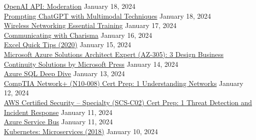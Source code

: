 \documentclass[10pt]{res} %
\begin{document}
\begin{resume}
\href{https://www.linkedin.com/learning/certificates/b073c9d3bcc1a341ef4e618526abf37df04bd7fcd250d2da87a54361739bb1f3}{\color{blue}OpenAI API: Moderation} \hfill January 18, 2024 \\
\href{https://www.linkedin.com/learning/certificates/3502c09cad07475d2d62a9f76be04f8eabe9f5ba771e18f6215a88fb8bdb9b4c}{\color{blue}Prompting ChatGPT with Multimodal Techniques} \hfill January 18, 2024 \\
\href{https://www.linkedin.com/learning/certificates/1c4c27b450d1c4c4c543a049db0ec7b9d7fec9fb2d4c75d6eb2b305c10e86fb4}{\color{blue}Wireless Networking Essential Training} \hfill January 17, 2024 \\
\href{https://www.linkedin.com/learning/certificates/e53f4594f3994cee458d78b7556205a49653ca2fd52f1b3e31cccd0eba4b54c4}{\color{blue}Communicating with Charisma} \hfill January 16, 2024 \\
\href{https://www.linkedin.com/learning/certificates/651a1d4ad40911e1334a87d136783c00d4451b2bd5ea97eac20f6f13bcb8cdb5}{\color{blue}Excel Quick Tips (2020)} \hfill January 15, 2024 \\
\href{https://www.linkedin.com/learning/certificates/a941f4915dbb94d82a9f93044c7d4454f598c5b94f8cd3968481bc2be69c357f}{\color{blue}Microsoft Azure Solutions Architect Expert (AZ-305): 3 Design Business Continuity Solutions by Microsoft Press} \hfill January 14, 2024 \\
\href{https://www.linkedin.com/learning/certificates/e49ebe6db42a5680c381a8ac475e7d13d572ff7b2703768e32b3ae682ff845c9}{\color{blue}Azure SQL Deep Dive} \hfill January 13, 2024 \\
\href{https://www.linkedin.com/learning/certificates/7aa6ef87c3c57a6adc95bd5c1a7e49644fc914f5ce57ca1ff8ec0921723d9528}{\color{blue}CompTIA Network+ (N10-008) Cert Prep: 1 Understanding Networks} \hfill January 12, 2024 \\
\href{https://www.linkedin.com/learning/certificates/6200b2344500142cadecb063aca87c29c8d20578bb1610d03f87a885b03fd2f9}{\color{blue}AWS Certified Security -- Specialty (SCS-C02) Cert Prep: 1 Threat Detection and Incident Response} \hfill January 11, 2024 \\
\href{https://www.linkedin.com/learning/certificates/deeb563d886fa3358b7501529e361fdde4ec4146bd8bc6af6be753ec5e4de385}{\color{blue}Azure Service Bus} \hfill January 11, 2024 \\
\href{https://www.linkedin.com/learning/certificates/2b2a3fd2e8db65809d23e8ce61eb2e19284e3f7b6d0090d2bc4c5a5ae755f7f3}{\color{blue}Kubernetes: Microservices (2018)} \hfill January 10, 2024 \\

\end{resume}
\end{document}

